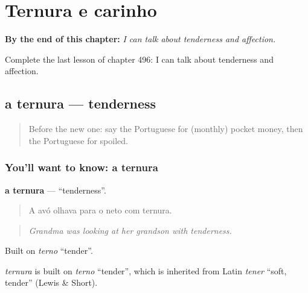 
\chapter{Ternura e carinho}
\label{ch:pt-ternura-e-carinho}

\begin{chapteropening}
\textbf{By the end of this chapter:} \emph{I can talk about tenderness and affection.}

Complete the last lesson of chapter 496: I can talk about tenderness and affection.
\end{chapteropening}

\section[a ternura]{a ternura — tenderness}

\label{lesson:PT-C496-ternura}



\begin{quote}
Before the new one: say the Portuguese for (monthly) pocket money, then the Portuguese for spoiled.
\end{quote}

\subsection*{You'll want to know: a ternura}
\textbf{a ternura} — \textquotedblleft{}tenderness\textquotedblright{}.

\begin{quote}
A avó olhava para o neto com ternura.
\end{quote}

\begin{quote}
\emph{Grandma was looking at her grandson with tenderness.}
\end{quote}

Built on \emph{terno} \textquotedblleft{}tender\textquotedblright{}.

\begin{cousinweb}
\emph{ternura} is built on \emph{terno} \textquotedblleft{}tender\textquotedblright{}, which is inherited from Latin \emph{tener} \textquotedblleft{}soft, tender\textquotedblright{} (Lewis \& Short).
\end{cousinweb}

